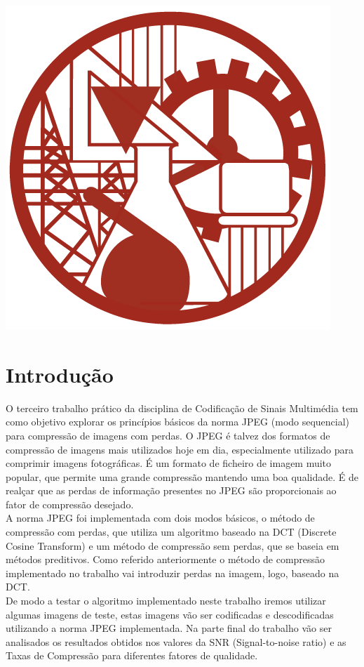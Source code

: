 \documentclass[12pt,a4paper]{article}
\begin{document}
\begin{titlepage}
\includegraphics[scale=0.3]{iselLogo.jpg}\\[1cm]
 
\vfill %
\end{titlepage}

\tableofcontents
\newpage
\listoffigures
\listoftables
\newpage
\section{Introdução}
O terceiro trabalho prático da disciplina de Codificação de Sinais Multimédia tem como objetivo explorar os princípios básicos da norma JPEG (modo sequencial) para compressão de imagens com perdas. O JPEG é talvez dos formatos de compressão de imagens mais utilizados hoje em dia, especialmente utilizado para comprimir imagens fotográficas. É um formato de ficheiro de imagem muito popular, que permite uma grande compressão mantendo uma boa qualidade. É de realçar que as perdas de informação presentes no JPEG são proporcionais ao fator de compressão desejado.\\
A norma JPEG foi implementada com dois modos básicos, o método de compressão com perdas, que utiliza um algoritmo baseado na DCT (Discrete Cosine Transform) e um método de compressão sem perdas, que se baseia em métodos preditivos. Como referido anteriormente o método de compressão implementado no trabalho vai introduzir perdas na imagem, logo, baseado na DCT.\\
De modo a testar o algoritmo implementado neste trabalho iremos utilizar algumas imagens de teste, estas imagens vão ser codificadas e descodificadas utilizando a norma JPEG implementada. Na parte final do trabalho vão ser analisados os resultados obtidos nos valores da SNR (Signal-to-noise ratio) e as Taxas de Compressão para diferentes fatores de qualidade.
\end{document}
